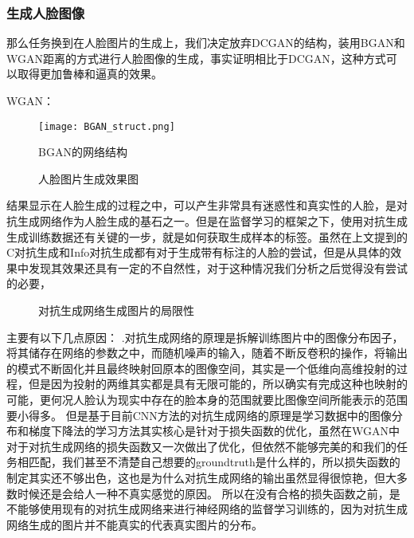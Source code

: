 \subsubsection{生成人脸图像}
那么任务换到在人脸图片的生成上，我们决定放弃DCGAN的结构，装用BGAN\cite{BGAN}和WGAN距离\cite{WGAN}的方式进行人脸图像的生成，事实证明相比于DCGAN，这种方式可以取得更加鲁棒和逼真的效果。

WGAN：

\begin{figure}
  \centering
    \texttt{[image: BGAN\_struct.png]}
  \caption{BGAN的网络结构}
\end{figure}

\begin{figure}[!ht]
 \centering 
	\caption{人脸图片生成效果图}
\end{figure}
结果显示在人脸生成的过程之中，可以产生非常具有迷惑性和真实性的人脸，是对抗生成网络作为人脸生成的基石之一。但是在监督学习的框架之下，使用对抗生成生成训练数据还有关键的一步，就是如何获取生成样本的标签。虽然在上文提到的C对抗生成和Info对抗生成都有对于生成带有标注的人脸的尝试，但是从具体的效果中发现其效果还具有一定的不自然性，对于这种情况我们分析之后觉得没有尝试的必要，
\begin{figure}[h]
\centering
{}
\caption{对抗生成网络生成图片的局限性}
\end{figure}

主要有以下几点原因：
.对抗生成网络的原理是拆解训练图片中的图像分布因子，将其储存在网络的参数之中，而随机噪声的输入，随着不断反卷积的操作，将输出的模式不断固化并且最终映射回原本的图像空间，其实是一个低维向高维投射的过程，但是因为投射的两维其实都是具有无限可能的，所以确实有完成这种也映射的可能，更何况人脸认为现实中存在的脸本身的范围就要比图像空间所能表示的范围要小得多。
但是基于目前CNN方法的对抗生成网络的原理是学习数据中的图像分布和梯度下降法的学习方法其实核心是针对于损失函数的优化，虽然在WGAN中对于对抗生成网络的损失函数又一次做出了优化，但依然不能够完美的和我们的任务相匹配，我们甚至不清楚自己想要的groundtruth是什么样的，所以损失函数的制定其实还不够出色，这也是为什么对抗生成网络的输出虽然显得很惊艳，但大多数时候还是会给人一种不真实感觉的原因。
所以在没有合格的损失函数之前，是不能够使用现有的对抗生成网络来进行神经网络的监督学习训练的，因为对抗生成网络生成的图片并不能真实的代表真实图片的分布。

